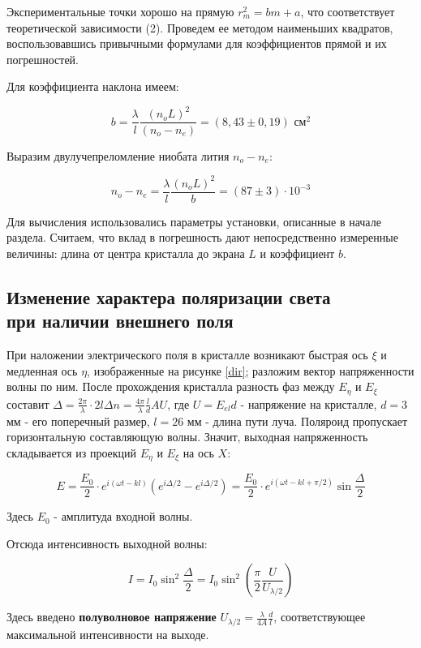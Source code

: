 \documentclass[12pt]{kiarticle}
\begin{document}
	Экспериментальные точки хорошо на прямую $r_m^2 = bm + a$, что соответствует теоретической зависимости (2). Проведем ее методом наименьших квадратов, воспользовавшись привычными формулами для коэффициентов прямой и их погрешностей.
	
	Для коэффициента наклона имеем: 
	
	\[ b = \frac{\lambda}{l} \frac{(n_oL)^2}{(n_o - n_e)} = (8,43 \pm 0,19) \text{ см}^2 \] 
	
	Выразим двулучепреломление ниобата лития $n_o - n_e$:
	
	\[ n_o - n_e = \frac{\lambda}{l}\frac{(n_oL)^2}{b} = (87 \pm 3) \cdot 10^{-3} \]
	
	Для вычисления использовались параметры установки, описанные в начале раздела. Считаем, что вклад в погрешность дают непосредственно измеренные величины: длина от центра кристалла до экрана $L$ и коэффициент $b$.
	
	\subsection{Изменение характера поляризации света \\ при наличии внешнего поля}
	
	При наложении электрического поля в кристалле возникают быстрая ось $\xi$ и медленная ось $\eta$, изображенные на рисунке \ref{dir}; разложим вектор напряженности волны по ним. После прохождения кристалла разность фаз между $E_\eta$ и $E_\xi$ составит $\Delta = \frac{2\pi}{\lambda} \cdot2l\Delta n = \frac{4\pi}{\lambda} \frac{l}{d} AU$, где $U = E_{el}d$ - напряжение на кристалле, $d = 3$ мм - его поперечный размер, $l = 26$ мм - длина пути луча. Поляроид пропускает горизонтальную составляющую волны. Значит, выходная напряженность складывается из проекций $E_\eta$ и $E_\xi$ на ось $X$:
	
	\[ E = \frac{E_0}{2} \cdot e^{i(\omega t - kl)} (e^{i\Delta/2} - e^{i\Delta/2}) = \frac{E_0}{2} \cdot  e^{i(\omega t - kl + \pi/2)} \sin\frac{\Delta}{2} \]
	
	Здесь $E_0$ - амплитуда входной волны.
	
	Отсюда интенсивность выходной волны: 
	
	\begin{equation}
		I = I_0 \sin^2\frac{\Delta}{2} = I_0\sin^2 \left(\frac{\pi}{2}\frac{U}{U_{\lambda/2}}\right) 
	\end{equation}
	
	Здесь введено \textbf{полуволновое напряжение} $U_{\lambda/2} = \frac{\lambda}{4A}\frac{d}{l}$, соответствующее максимальной интенсивности на выходе.
	
\end{document}
